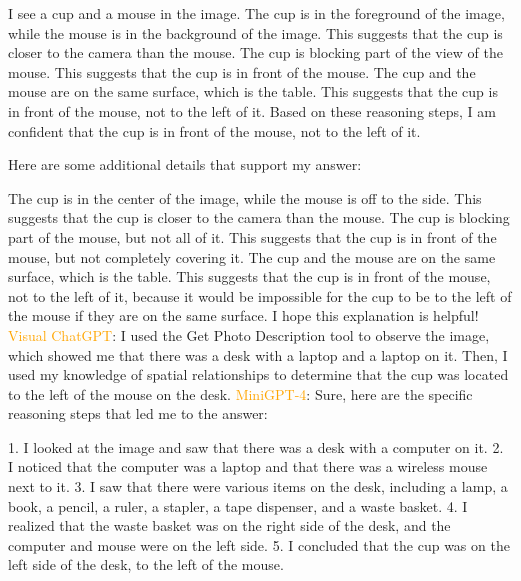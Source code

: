 \begin{enumerate}
    I see a cup and a mouse in the image.
    The cup is in the foreground of the image, while the mouse is in the background of the image. This suggests that the cup is closer to the camera than the mouse.
    The cup is blocking part of the view of the mouse. This suggests that the cup is in front of the mouse.
    The cup and the mouse are on the same surface, which is the table. This suggests that the cup is in front of the mouse, not to the left of it.
    Based on these reasoning steps, I am confident that the cup is in front of the mouse, not to the left of it.

    Here are some additional details that support my answer:

    The cup is in the center of the image, while the mouse is off to the side. This suggests that the cup is closer to the camera than the mouse.
    The cup is blocking part of the mouse, but not all of it. This suggests that the cup is in front of the mouse, but not completely covering it.
    The cup and the mouse are on the same surface, which is the table. This suggests that the cup is in front of the mouse, not to the left of it, because it would be impossible for the cup to be to the left of the mouse if they are on the same surface.
    I hope this explanation is helpful!
    \subitem \textcolor{orange}{Visual ChatGPT}: I used the Get Photo Description tool to observe the image, which showed me that there was a desk with a laptop and a laptop on it. Then, I used my knowledge of spatial relationships to determine that the cup was located to the left of the mouse on the desk.
    \subitem \textcolor{orange}{MiniGPT-4}: Sure, here are the specific reasoning steps that led me to the answer:

    1. I looked at the image and saw that there was a desk with a computer on it.
    2. I noticed that the computer was a laptop and that there was a wireless mouse next to it.
    3. I saw that there were various items on the desk, including a lamp, a book, a pencil, a ruler, a stapler, a tape dispenser, and a waste basket.
    4. I realized that the waste basket was on the right side of the desk, and the computer and mouse were on the left side.
    5. I concluded that the cup was on the left side of the desk, to the left of the mouse.
\end{enumerate}
